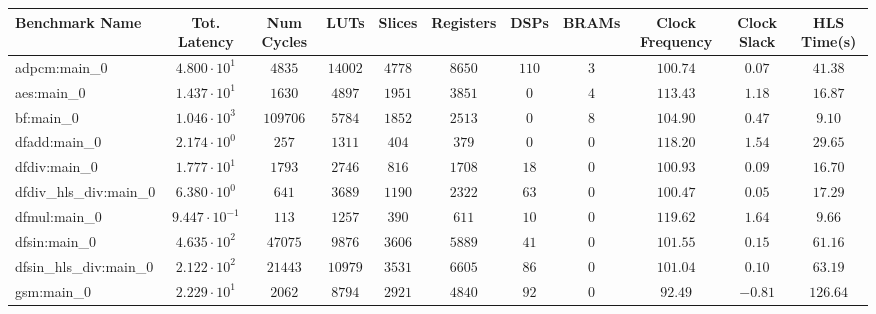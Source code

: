 \begin{tabular}{|l|c|c|c|c|c|c|c|c|c|c|}
\hline
Benchmark Name          & Tot. Latency            & Num Cycles & LUTs      & Slices    & Registers & DSPs    & BRAMs  & Clock Frequency & Clock Slack & HLS Time(s) \\
\hline
adpcm:main\_0           & $ 4.800 \cdot 10^{1}  $ & $ 4835   $ & $ 14002 $ & $ 4778  $ & $ 8650  $ & $ 110 $ & $ 3  $ & $ 100.74      $ & $ 0.07    $ & $ 41.38   $ \\
aes:main\_0             & $ 1.437 \cdot 10^{1}  $ & $ 1630   $ & $ 4897  $ & $ 1951  $ & $ 3851  $ & $ 0   $ & $ 4  $ & $ 113.43      $ & $ 1.18    $ & $ 16.87   $ \\
bf:main\_0              & $ 1.046 \cdot 10^{3}  $ & $ 109706 $ & $ 5784  $ & $ 1852  $ & $ 2513  $ & $ 0   $ & $ 8  $ & $ 104.90      $ & $ 0.47    $ & $ 9.10    $ \\
dfadd:main\_0           & $ 2.174 \cdot 10^{0}  $ & $ 257    $ & $ 1311  $ & $ 404   $ & $ 379   $ & $ 0   $ & $ 0  $ & $ 118.20      $ & $ 1.54    $ & $ 29.65   $ \\
dfdiv:main\_0           & $ 1.777 \cdot 10^{1}  $ & $ 1793   $ & $ 2746  $ & $ 816   $ & $ 1708  $ & $ 18  $ & $ 0  $ & $ 100.93      $ & $ 0.09    $ & $ 16.70   $ \\
dfdiv\_hls\_div:main\_0 & $ 6.380 \cdot 10^{0}  $ & $ 641    $ & $ 3689  $ & $ 1190  $ & $ 2322  $ & $ 63  $ & $ 0  $ & $ 100.47      $ & $ 0.05    $ & $ 17.29   $ \\
dfmul:main\_0           & $ 9.447 \cdot 10^{-1} $ & $ 113    $ & $ 1257  $ & $ 390   $ & $ 611   $ & $ 10  $ & $ 0  $ & $ 119.62      $ & $ 1.64    $ & $ 9.66    $ \\
dfsin:main\_0           & $ 4.635 \cdot 10^{2}  $ & $ 47075  $ & $ 9876  $ & $ 3606  $ & $ 5889  $ & $ 41  $ & $ 0  $ & $ 101.55      $ & $ 0.15    $ & $ 61.16   $ \\
dfsin\_hls\_div:main\_0 & $ 2.122 \cdot 10^{2}  $ & $ 21443  $ & $ 10979 $ & $ 3531  $ & $ 6605  $ & $ 86  $ & $ 0  $ & $ 101.04      $ & $ 0.10    $ & $ 63.19   $ \\
gsm:main\_0             & $ 2.229 \cdot 10^{1}  $ & $ 2062   $ & $ 8794  $ & $ 2921  $ & $ 4840  $ & $ 92  $ & $ 0  $ & $ 92.49       $ & $ -0.81   $ & $ 126.64  $ \\

\end{tabular}
